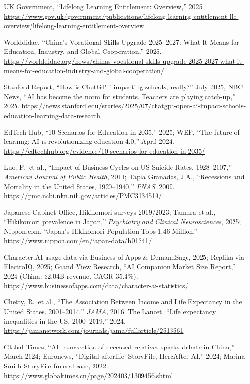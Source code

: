 \documentclass[11pt,a4paper]{article}
\begin{document}
\noindent [99] UK Government, ``Lifelong Learning Entitlement: Overview,'' 2025. \url{https://www.gov.uk/government/publications/lifelong-learning-entitlement-lle-overview/lifelong-learning-entitlement-overview}

\noindent [100] Worlddidac, ``China's Vocational Skills Upgrade 2025--2027: What It Means for Education, Industry, and Global Cooperation,'' 2025. \url{https://worlddidac.org/news/chinas-vocational-skills-upgrade-2025-2027-what-it-means-for-education-industry-and-global-cooperation/}

\noindent [101] Stanford Report, ``How is ChatGPT impacting schools, really?'' July 2025; NBC News, ``AI has become the norm for students. Teachers are playing catch-up,'' 2025. \url{https://news.stanford.edu/stories/2025/07/chatgpt-open-ai-impact-schools-education-learning-data-research}

\noindent [102] EdTech Hub, ``10 Scenarios for Education in 2035,'' 2025; WEF, ``The future of learning: AI is revolutionizing education 4.0,'' April 2024. \url{https://edtechhub.org/evidence/10-scenarios-for-education-in-2035/}

\noindent [103] Luo, F.\ et al., ``Impact of Business Cycles on US Suicide Rates, 1928--2007,'' \textit{American Journal of Public Health}, 2011; Tapia Granados, J.A., ``Recessions and Mortality in the United States, 1920--1940,'' \textit{PNAS}, 2009. \url{https://pmc.ncbi.nlm.nih.gov/articles/PMC3134519/}

\noindent [104] Japanese Cabinet Office, Hikikomori surveys 2019/2023; Tamura et al., ``Hikikomori prevalence in Japan,'' \textit{Psychiatry and Clinical Neurosciences}, 2025; Nippon.com, ``Japan's Hikikomori Population Tops 1.46 Million.'' \url{https://www.nippon.com/en/japan-data/h01341/}

\noindent [105] Character.AI usage data via Business of Apps \& DemandSage, 2025; Replika via ElectroIQ, 2025; Grand View Research, ``AI Companion Market Size Report,'' 2024 (China: \$2.04B revenue, CAGR 35.4\%). \url{https://www.businessofapps.com/data/character-ai-statistics/}

\noindent [106] Chetty, R.\ et al., ``The Association Between Income and Life Expectancy in the United States, 2001--2014,'' \textit{JAMA}, 2016; The Lancet, ``Life expectancy inequalities in the US, 2000--2019,'' 2024. \url{https://jamanetwork.com/journals/jama/fullarticle/2513561}

\noindent [107] Global Times, ``AI resurrection of deceased relatives sparks debate in China,'' March 2024; Euronews, ``Digital afterlife: StoryFile, HereAfter AI,'' 2024; Marina Smith StoryFile funeral case, 2022. \url{https://www.globaltimes.cn/page/202403/1309456.shtml}
\end{document}
